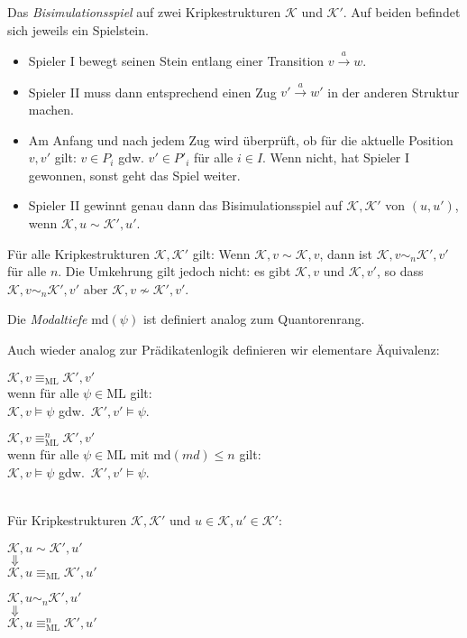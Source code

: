 \documentclass[a4paper,parskip=half*,DIV=15,fontsize=11pt]{scrartcl}
\newcommand{\K}{\mathcal{K}}
\newcommand{\ML}{\mathrm{ML}}
\begin{document}
Das \emph{Bisimulationsspiel} auf zwei Kripkestrukturen $\K$ und $\K'$.
Auf beiden befindet sich jeweils ein Spielstein.
\begin{itemize}
\item[] Spieler I bewegt seinen Stein entlang einer Transition $v \overset{a}{\to} w$.
\item[] Spieler II muss dann entsprechend einen Zug $v' \overset{a}{\to} w'$ in der anderen Struktur machen.
\item[] Am Anfang und nach jedem Zug wird überprüft, ob für die aktuelle Position $v, v'$ gilt: $v \in P_i$ gdw. $v' \in P'_i$ für alle $i \in I$. Wenn nicht, hat Spieler I gewonnen, sonst geht das Spiel weiter.
\item[] Spieler II gewinnt genau dann das Bisimulationsspiel auf $\K, \K'$ von $(u,u')$, wenn $\K, u \sim \K', u'$.
\end{itemize}

Für alle Kripkestrukturen $\K, \K'$ gilt: Wenn $\K, v \sim \K, v$, dann ist $\K, v \sim_n \K', v'$ für alle $n$. Die Umkehrung gilt jedoch nicht: es gibt $\K, v$ und $\K, v'$, so dass $\K, v \sim_n \K', v'$ aber $\K, v \not\sim \K', v'$.

Die \emph{Modaltiefe} $\mathrm{md}(\psi)$ ist definiert analog zum Quantorenrang.

Auch wieder analog zur Prädikatenlogik definieren wir elementare Äquivalenz:

\begin{minipage}{0.4\textwidth}
\centering
$\K, v \equiv_\ML \K', v'$ \\
{\small wenn für alle $\psi \in \ML$ gilt: \\}
$\K, v \models \psi$ gdw.\ $\K', v' \models \psi$.
\end{minipage}\hspace{0.1\textwidth}
\begin{minipage}{0.4\textwidth}
\centering
$\K, v \equiv_\ML^n \K', v'$ \\
{\small wenn für alle $\psi \in \ML$ mit $\mathrm{md}(md) \leq n$ gilt: \\}
$\K, v \models \psi$ gdw.\ $\K', v' \models \psi$.
\end{minipage}
\ \\

Für Kripkestrukturen $\K, \K'$ und $u \in \K, u' \in \K'$:

\begin{minipage}{0.4\textwidth}
\centering
$\K, u \sim \K', u'$ \\
$\Downarrow$ \\
$\K, u \equiv_\ML \K', u'$
\end{minipage}\hspace{0.1\textwidth}
\begin{minipage}{0.4\textwidth}
\centering
$\K, u \sim_n \K', u'$ \\
$\Downarrow$ \\
$\K, u \equiv_\ML^n \K', u'$
\end{minipage}
\ \\
\end{document}
